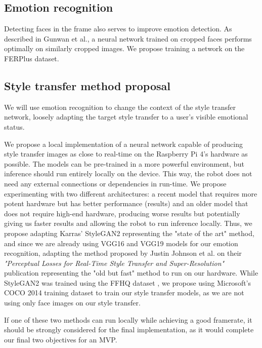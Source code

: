 \subsection{Emotion recognition}
Detecting faces in the frame also serves to improve emotion detection. As described in Gunwan et al.\cite{haarcrop}, a neural network trained on cropped faces performs optimally on similarly cropped images. We propose training a network on the FERPlus\cite{BarsoumICMI2016} dataset.


\subsection{Style transfer method proposal}

We will use emotion recognition to change the context of the style transfer network, loosely adapting the target style transfer to a user's visible emotional status.


We propose a local implementation of a neural network capable of producing style transfer images as close to real-time on the Raspberry Pi 4's hardware as possible. The models can be pre-trained in a more powerful environment, but inference should run entirely locally on the device. This way, the robot does not need any external connections or dependencies in run-time. We propose experimenting with two different architectures: a recent model that requires more potent hardware but has better performance (results) and an older model that does not require high-end hardware, producing worse results but potentially giving us faster results and allowing the robot to run inference locally. Thus, we propose adapting Karras' StyleGAN2 representing the "state of the art" method, and since we are already using VGG16 and VGG19 models for our emotion recognition, adapting the method proposed by Justin Johnson et al. on their \emph{"Perceptual Losses for Real-Time Style Transfer
and Super-Resolution"} \cite{Johnson2016Perceptual} publication representing the "old but fast" method to run on our hardware.
While StyleGAN2 was trained using the FFHQ dataset \cite{nvlabs_2019}, we propose using Microsoft's COCO 2014 training dataset\cite{DBLP:journals/corr/LinMBHPRDZ14} to train our style transfer models, as we are not using only face images on our style transfer. 

If one of these two methods can run locally while achieving a good framerate, it should be strongly considered for the final implementation, as it would complete our final two objectives for an MVP.

